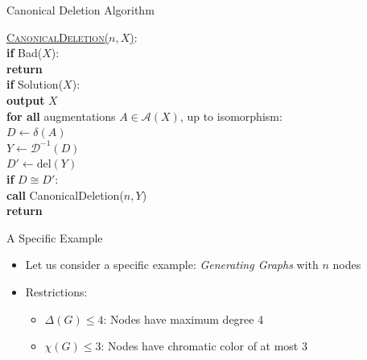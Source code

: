 \documentclass[aspectratio=169]{beamer}
\begin{document}
\begin{frame}{Canonical Deletion Algorithm}
    \begin{nalgo}
    \underline{\textsc{CanonicalDeletion}($n, X$)}:
    \\\label{}  \textbf{if} Bad($X$): \hspace{20.5pt} \+
    \\\label{}      \textbf{return} \-
    \\\label{}  \textbf{if} Solution($X$): \+
    \\\label{}      \textbf{output} $X$ \-
    \\\label{}  \textbf{for all} augmentations $A \in {\mathcal A}(X)$, up to isomorphism: \+
    \\\label{}      $D \leftarrow \delta(A)$ \hspace{15.5pt}
    \\\label{}      $Y \leftarrow {\mathcal D}^{-1}(D)$ 
    \\\label{}      $D' \leftarrow {\mathrm{del}}(Y)$ \hspace{3pt}
    \\\label{}      \textbf{if} $D \cong D'$: \hspace{11.5pt} \+
    \\\label{}          \textbf{call} CanonicalDeletion($n, Y$) \-\-
    \\\label{} \textbf{return}
    \end{nalgo}
\end{frame}

\begin{frame}{A Specific Example}
    \begin{itemize}
        \item Let us consider a specific example: \textcolor{sigma@mainblue}{\emph{Generating Graphs}} with $n$ nodes\pause
        \item Restrictions:
        \begin{itemize}
            \item $\Delta(G) \leq 4$: Nodes have maximum degree 4
            \item $\chi(G) \leq 3$: Nodes have chromatic color of at most 3
        \end{itemize}
    \end{itemize}
\end{frame}
\end{document}
